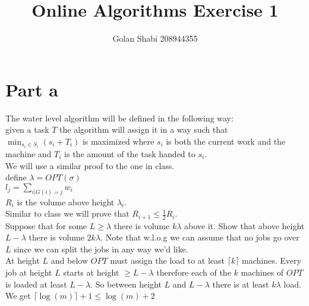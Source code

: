 \documentclass{article}
\title{Online Algorithms Exercise 1}
\author{Golan Shabi 208944355}
\begin{document}
\maketitle
\section{Part a}

The water level algorithm will be defined in the following way:\\
given a task $T$ the algorithm will assign it in a way such that $\min_{s_i\in S_i}(s_i+T_i)$ is maximized where $s_i$ is both the current work and the machine and $T_i$ is the amount of the task handed to $s_i$.\\
We will use a similar proof to the one in class. \\
define $\lambda=OPT(\sigma)$\\
$l_j=\sum_{i|G(i)=j}w_i$\\
$R_i$ is the volume above height $\lambda_i$.\\
Similar to class we will prove that $R_{i+1}\leq \frac{1}{2}R_i$. \\
Suppose that for some $L\geq \lambda$ there is volume $k\lambda$ above it. Show that above height $L-\lambda$ there is volume $2k\lambda$. Note that w.l.o.g we can assume that no jobs go over $L$ since we can split the jobs in any way we'd like.\\
At height $L$ and below $OPT$ must assign the load to at least $\lceil k \rceil$ machines. Every job at height $L$ starts at height $\geq L-\lambda$ therefore each of the $k$ machines of $OPT$ is loaded at least $L-\lambda$. So between height $L$ and $L-\lambda$ there is at least $k\lambda$ load.\\
We get $\lceil\log(m)\rceil+1\leq\log(m)+2$ 
\pagebreak
\end{document}
